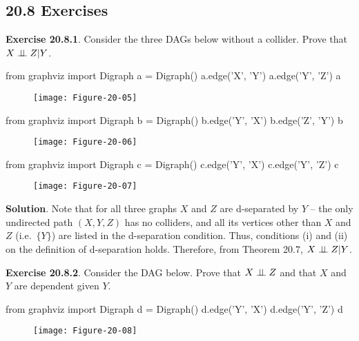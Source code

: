 \subsection*{20.8 Exercises}

\textbf{Exercise 20.8.1}. Consider the three DAGs below without a
collider. Prove that \(X \perp\!\!\!\perp Z | Y\).

\begin{python}
from graphviz import Digraph
a = Digraph()
a.edge('X', 'Y')
a.edge('Y', 'Z')
a
\end{python}

\begin{figure}[H]
\centering
\texttt{[image: Figure-20-05]}
\end{figure}


\begin{python}
from graphviz import Digraph
b = Digraph()
b.edge('Y', 'X')
b.edge('Z', 'Y')
b
\end{python}

\begin{figure}[H]
\centering
\texttt{[image: Figure-20-06]}
\end{figure}


\begin{python}
from graphviz import Digraph
c = Digraph()
c.edge('Y', 'X')
c.edge('Y', 'Z')
c
\end{python}

\begin{figure}[H]
\centering
\texttt{[image: Figure-20-07]}
\end{figure}


\textbf{Solution}.
Note that for all three graphs \(X\) and \(Z\) are d-separated by \(Y\)
-- the only undirected path \((X, Y, Z)\) has no colliders, and all its
vertices other than \(X\) and \(Z\) (i.e.~\(\{ Y \}\)) are listed in the
d-separation condition. Thus, conditions (i) and (ii) on the definition
of d-separation holds.
Therefore, from Theorem 20.7, \(X \perp\!\!\!\perp Z | Y\).

\textbf{Exercise 20.8.2}. Consider the DAG below. Prove that
\(X \perp\!\!\!\perp Z\) and that \(X\) and \(Y\) are dependent given \(Y\).

\begin{python}
from graphviz import Digraph
d = Digraph()
d.edge('Y', 'X')
d.edge('Y', 'Z')
d
\end{python}

\begin{figure}[H]
\centering
\texttt{[image: Figure-20-08]}
\end{figure}


